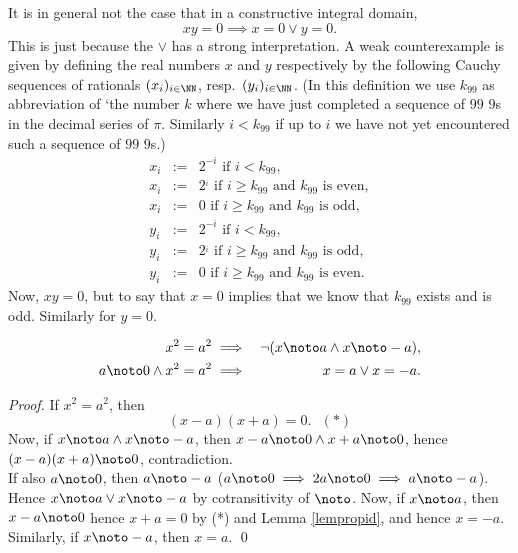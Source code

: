\begin{remark}
  It is in general not the case that in a constructive integral
  domain,
$$xy = 0 \implies x =0 \vee y =0.$$
This is just because the $\vee$ has a strong interpretation. A weak
counterexample is given by defining the real numbers $x$ and $y$
respectively by the following Cauchy sequences of rationals
$(x_i)_{i\in\NN}$, resp.\ $(y_i)_{i\in\NN}$.
(In this definition we use  $k_{99}$ as abbreviation of `the number
$k$ where we have just completed a sequence of 
$99$ $9$s in the decimal series of $\pi$. Similarly $i<k_{99}$ if up
to $i$ we have not yet encountered such a sequence of $99$ $9$s.)
\begin{eqnarray*}
  x_i &:=& 2^{-i} \mbox{ if } i<k_{99},\\
  x_i &:=& 2^{_i} \mbox{ if } i\geq k_{99} \mbox{ and } k_{99} \mbox{ is
  even},\\
  x_i &:=& 0 \mbox{ if } i\geq k_{99} \mbox{ and } k_{99} \mbox{ is
  odd},\\
  y_i &:=& 2^{-i} \mbox{ if } i<k_99,\\
  y_i &:=& 2^{_i} \mbox{ if } i\geq k_{99} \mbox{ and } k_{99} \mbox{ is
  odd},\\
  y_i &:=& 0 \mbox{ if } i\geq k_{99} \mbox{ and } k_{99} \mbox{ is
  even}.
\end{eqnarray*}
Now, $xy = 0$, but to say that $x=0$ implies that we know that $k_99$
exists and is odd. Similarly for $y=0$.
\end{remark}


\begin{lemma}\label{lemidsqu}
  \begin{eqnarray*}
    x^2 = a^2 &\implies& \neg(x\noto a \wedge x\noto -a),\\
a\noto 0\wedge x^2 = a^2 &\implies& x= a \vee x= -a.\\
  \end{eqnarray*}
\end{lemma}

\begin{proof}
If $x^2 = a^2$, then 
$$(x-a)(x+a) = 0.\:\:\: (*)$$ 
Now, if $x\noto a \wedge x\noto
-a$, then $x-a \noto 0 \wedge x+a\noto 0$, hence $(x-a)(x+a) \noto 0$,
contradiction.\\
If also $a\noto 0$, then $a\noto -a$ ($a\noto 0 \implies 2a\noto 0
\implies a\noto -a$). Hence $x\noto a \vee x\noto -a$ by
cotransitivity of $\noto$. Now, if $x\noto a$, then $x-a \noto 0$
hence $x+a = 0$ by (*) and Lemma \ref{lempropid}, and hence
$x=-a$. Similarly, if $x\noto -a$, then $x = a$.
\qed
\end{proof}

